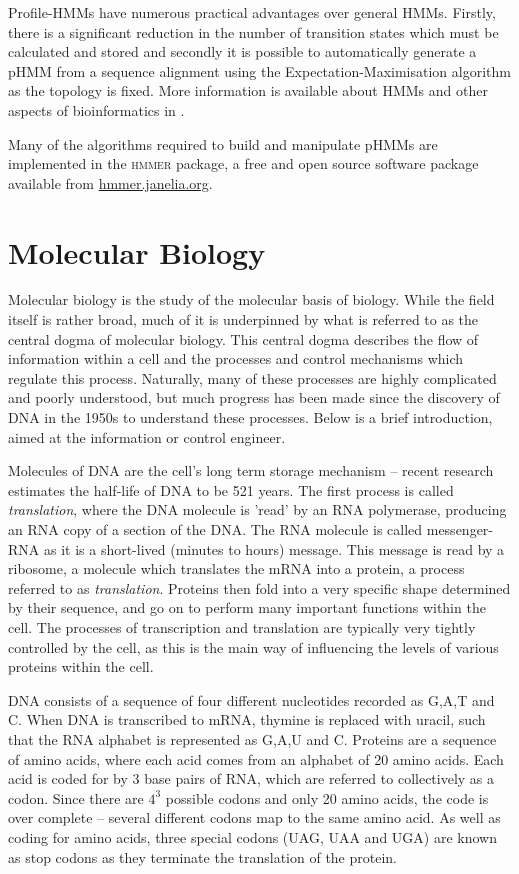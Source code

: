 \documentclass[twoside,a4paper]{article}
\begin{document}
\begin{multicols}{2}
Profile-HMMs have numerous practical advantages over general HMMs. 
Firstly, there is a significant reduction in the number of transition states
which must be calculated and stored and secondly it is possible to 
automatically
generate a pHMM from a sequence alignment using the Expectation-Maximisation
algorithm as the topology is fixed. More information is available about HMMs
and other aspects of bioinformatics in \cite{Durbin1998}.

Many of the algorithms required to build and manipulate pHMMs are implemented
in the \textsc{hmmer}\cite{HMMERguide} package, a free and open source software 
package available from \href{http://hmmer.janelia.org/}{hmmer.janelia.org}.

\section{Molecular Biology}
\label{sec:mbio}

Molecular biology is the study of the molecular basis of biology.
While the field itself is rather broad, much of it is underpinned by what is
referred to as the central dogma of molecular biology.
This central dogma describes the flow of information within a cell and the
processes and control mechanisms which regulate this process.
Naturally, many of these processes are highly complicated and poorly
understood, but much progress has been made since the discovery of DNA in the
1950s to understand these processes.
Below is a brief introduction, aimed at the information or control engineer.

Molecules of DNA are the cell's long term storage mechanism -- recent research
estimates the half-life of DNA to be 521 years\cite{DNAhalflife}.
The first process is called \textit{translation}, where the DNA molecule is
'read' by an RNA polymerase, producing an RNA copy of a section of the DNA.
The RNA molecule is called messenger-RNA as it is a short-lived (minutes to
hours) message.
This message is read by a ribosome, a molecule which translates the mRNA into a
protein, a process referred to as \textit{translation}.
Proteins then fold into a very specific shape determined by their 
sequence, and go on to perform many important functions within the cell.
The processes of transcription and translation are typically very tightly
controlled by the cell, as this is the main way of influencing the levels of
various proteins within the cell.

DNA consists of a sequence of four different nucleotides recorded as G,A,T and C.
When DNA is transcribed to mRNA, thymine is replaced with uracil, such that the
RNA alphabet is represented as G,A,U and C.
Proteins are a sequence of amino acids, where each acid comes from an alphabet
of 20 amino acids.
Each acid is coded for by 3 base pairs of RNA, which are referred to
collectively as a codon.
Since there are $4^3$ possible codons and only 20 amino acids, the code is
over complete -- several different codons map to the same amino acid.
As well as coding for amino acids, three special codons (UAG, UAA and UGA) are
known as stop codons as they terminate the translation of the protein.


\end{multicols}
\end{document}
